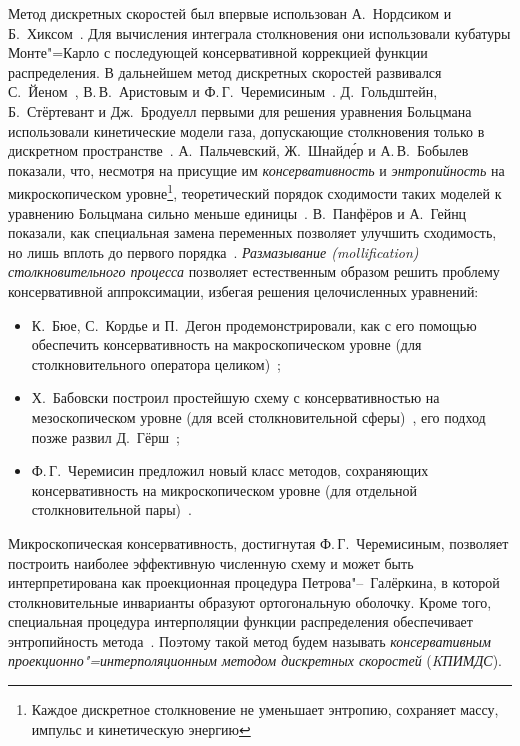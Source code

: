 Метод дискретных скоростей был впервые использован А.~Нордсиком и Б.~Хиксом~\autocite{Nordsieck1966}.
Для вычисления интеграла столкновения они использовали кубатуры Монте"=Карло
с последующей консервативной коррекцией функции распределения.
В дальнейшем метод дискретных скоростей развивался С.~Йеном~\autocite{Yen1984},
В.\,В.~Аристовым и Ф.\,Г.~Черемисиным~\autocite{Tcheremissine1980}.
Д.~Гольдштейн, Б.~Стёртевант и Дж.~Бродуелл первыми для решения уравнения Больцмана использовали
кинетические модели газа, допускающие столкновения только в дискретном пространстве~\autocite{Goldstein1989}.
А.~Пальчевский, Ж.~Шнайд\'{е}р и А.\,В.~Бобылев показали, что,
несмотря на присущие им \emph{консервативность} и \emph{энтропийность} на микроскопическом уровне\footnote{
    Каждое дискретное столкновение не уменьшает энтропию, сохраняет массу, импульс и кинетическую энергию},
теоретический порядок сходимости таких моделей к уравнению Больцмана сильно меньше единицы~\autocite{Palczewski1997}.
В.~Панфёров и А.~Гейнц показали, как специальная замена переменных
позволяет улучшить сходимость, но лишь вплоть до первого порядка~\autocite{Panferov2002}.
\emph{Размазывание (mollification) столкновительного процесса} позволяет естественным образом
решить проблему консервативной аппроксимации, избегая решения целочисленных уравнений:
\begin{itemize}
    \item К.~Бюе, С.~Кордье и П.~Дегон продемонстрировали, как с его помощью обеспечить консервативность
    на макроскопическом уровне (для столкновительного оператора целиком)~\autocite{Buet1998};
    \item Х.~Бабовски построил простейшую схему с консервативностью на мезоскопическом уровне
    (для всей столкновительной сферы)~\autocite{Babovsky1998}, его подход позже развил Д.~Гёрш~\autocite{Goersch2002};
    \item Ф.\,Г.~Черемисин предложил новый класс методов, сохраняющих консервативность
    на микроскопическом уровне (для отдельной столкновительной пары)~\autocite{Tcheremissine1997}.
\end{itemize}
Микроскопическая консервативность, достигнутая Ф.\,Г.~Черемисиным, позволяет построить наиболее эффективную
численную схему и может быть интерпретирована как проекционная процедура Петрова"--~Галёркина,
в которой столкновительные инварианты образуют ортогональную оболочку.
Кроме того, специальная процедура интерполяции функции распределения обеспечивает
энтропийность метода~\autocite{Tcheremissine2000}. Поэтому такой метод будем называть
\emph{консервативным проекционно"=интерполяционным методом дискретных скоростей} (\emph{KПИМДС}).

